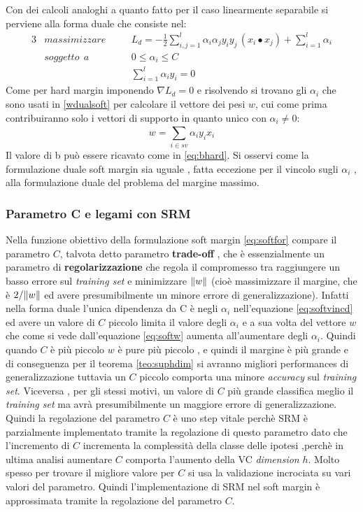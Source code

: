 Con dei calcoli analoghi a quanto fatto per il caso linearmente separabile si perviene alla forma duale che consiste nel:
\begin{alignat}{3}
\label{eq:softford}
&massimizzare \quad&&L_{d} = - \frac{1}{2} \sum_{i,j = 1}^{l}\alpha_{i}\alpha_{j}y_{i}y_{j}\,(x_{i} \bullet x_{j}) + \sum_{i=1}^{l}\alpha_{i} \\
\label{eq:softvincd}
&soggetto \:\:a &&0 \leq \alpha_i \leq C \qquad \qquad \\
\label{eq:softvind2}
&\:&&\sum_{i=1}^{l} \alpha_i y_i = 0 
\end{alignat}
Come per hard margin imponendo $\nabla L_d = 0$ e risolvendo si trovano gli $\alpha_i$ che sono usati in \ref{wdualsoft} per calcolare il vettore dei pesi $w$, cui come prima contribuiranno solo i vettori di supporto in quanto unico con $\alpha_i \neq 0$:
\begin{equation}
\label{eq:softw}
w = \sum_{i \in sv}^{}\alpha_iy_ix_i
\end{equation}
Il valore di b può essere ricavato come in \eqref{eq:bhard}.
Si osservi come la formulazione duale soft margin sia uguale , fatta eccezione per il vincolo sugli $\alpha_i$ , alla formulazione duale del problema del margine massimo. 

\subsubsection{Parametro C e legami con SRM}
Nella funzione obiettivo della formulazione soft margin \eqref{eq:softfor} compare il parametro $C$, talvota detto parametro \textbf{trade-off} , che è essenzialmente un parametro di \textbf{regolarizzazione} che regola il compromesso tra raggiungere un basso errore sul \textit{training set} e minimizzare $\lVert w\rVert$ (cioè massimizzare il margine, che è $2/\lVert w\rVert$ ed avere presumibilmente un minore errore di generalizzazione). Infatti nella forma duale l'unica dipendenza da C è negli $\alpha_i$ nell'equazione \eqref{eq:softvincd} ed avere un valore di $C$ piccolo limita il valore degli $\alpha_i$ e a sua volta del vettore $w$ che come si vede dall'equazione \eqref{eq:softw} aumenta all'aumentare degli $\alpha_i$. Quindi quando $C$ è più piccolo $w$ è pure più piccolo , e quindi il margine è più grande e di conseguenza per il teorema \ref{teo:suphdim} si avranno migliori performances di generalizzazione tuttavia un $C$ piccolo  comporta una minore \textit{accuracy} sul \textit{training set}. Viceversa , per gli stessi motivi, un valore di $C$ più grande classifica meglio il \textit{training set} ma avrà presumibilmente un maggiore errore di generalizzazione. Quindi la regolazione del parametro $C$ è uno step vitale perchè \ac{SRM} è parzialmente implementato tramite la regolazione di questo parametro dato che l'incremento di $C$ incrementa la complessità della classe delle ipotesi ,perchè in ultima analisi aumentare $C$ comporta l'aumento della \ac{VC} \textit{dimension} $h$. Molto spesso per trovare il migliore valore per $C$ si usa la validazione incrociata su vari valori del parametro. Quindi l'implementazione di \ac{SRM} nel soft margin è approssimata tramite la regolazione del parametro $C$.

